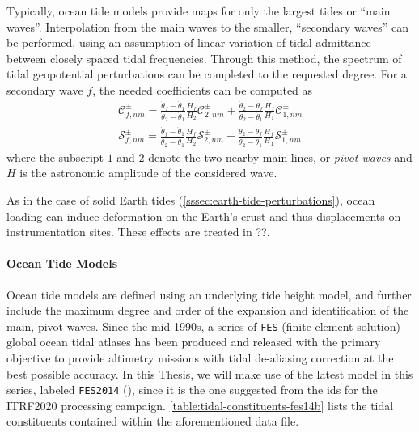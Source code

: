Typically, ocean tide models provide maps for only the largest tides or ``main waves''. 
Interpolation from the main waves to the smaller, ``secondary waves'' can be performed, 
using an assumption of linear variation of tidal admittance between closely spaced 
tidal frequencies. Through this method, the spectrum of tidal geopotential perturbations 
can be completed to the requested degree. For a secondary wave $f$, the needed 
coefficients can be computed as
\begin{equation}\label{eq:iers10616}
  \begin{aligned}
    \mathcal{C}_{f,nm}^{\pm} = \frac{\dot{\theta}_f - \dot{\theta}_1}{\dot{\theta}_2 - 
        \dot{\theta}_1} \frac{H_f}{H_2} \mathcal{C}_{2,nm}^{\pm} 
        + \frac{\dot{\theta}_2 - \dot{\theta}_f}{\dot{\theta}_2 - \dot{\theta}_1}
        \frac{H_f}{H_1} \mathcal{C}_{1,nm}^{\pm} \\
    \mathcal{S}_{f,nm}^{\pm} = \frac{\dot{\theta}_f - \dot{\theta}_1}{\dot{\theta}_2 - \dot{\theta}_1} 
      \frac{H_f}{H_2} \mathcal{S}_{2,nm}^{\pm} 
      + \frac{\dot{\theta}_2 - \dot{\theta}_f}{\dot{\theta}_2 - \dot{\theta}_1} 
      \frac{H_f}{H_1} \mathcal{S}_{1,nm}^{\pm}
  \end{aligned}
\end{equation}
where the subscript $1$ and $2$ denote the two nearby main lines, or \emph{pivot waves} 
and $H$ is the astronomic amplitude of the considered wave.

As in the case of solid Earth tides (\autoref{sssec:earth-tide-perturbations}), 
ocean loading can induce deformation on the Earth's crust and thus displacements 
on instrumentation sites. These effects are treated in ??.

\paragraph{Ocean Tide Models}\label{par:ocean-tide-models}

Ocean tide models are defined using an underlying tide height model, and further 
include the  maximum degree and order of the expansion and identification of the 
main, pivot waves. Since the mid-1990s, a series of \texttt{FES} (finite element 
solution) global ocean tidal atlases has been produced and released with the primary 
objective to provide altimetry missions with tidal de-aliasing correction at the 
best possible accuracy. In this Thesis, we will make use of the latest model in 
this series, labeled \texttt{FES2014} (\cite{Lyard2021}), since it is the one suggested 
from the \gls{ids} for the ITRF2020 processing campaign. \autoref{table:tidal-constituents-fes14b} 
lists the tidal constituents contained within the aforementioned data file.

